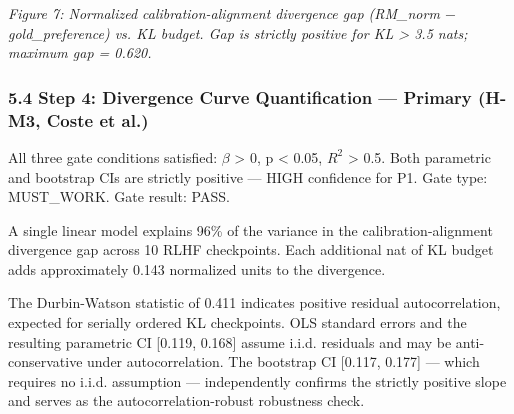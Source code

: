 \textit{Figure 7: Normalized calibration-alignment divergence gap (RM\_norm $-$ gold\_preference) vs. KL budget. Gap is strictly positive for KL > 3.5 nats; maximum gap = 0.620.}

\subsubsection{5.4 Step 4: Divergence Curve Quantification --- Primary (H-M3, Coste et al.)}

\begin{table}[htbp]
\centering
{}
\end{table}

All three gate conditions satisfied: $\beta$ > 0, p < 0.05, $R^2$ > 0.5. Both parametric and bootstrap CIs are strictly positive --- HIGH confidence for P1. Gate type: MUST\_WORK. Gate result: PASS.

A single linear model explains 96\% of the variance in the calibration-alignment divergence gap across 10 RLHF checkpoints. Each additional nat of KL budget adds approximately 0.143 normalized units to the divergence.

The Durbin-Watson statistic of 0.411 indicates positive residual autocorrelation, expected for serially ordered KL checkpoints. OLS standard errors and the resulting parametric CI [0.119, 0.168] assume i.i.d. residuals and may be anti-conservative under autocorrelation. The bootstrap CI [0.117, 0.177] --- which requires no i.i.d. assumption --- independently confirms the strictly positive slope and serves as the autocorrelation-robust robustness check.

